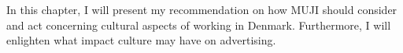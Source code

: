 In this chapter, I will present my recommendation on how MUJI should consider and act concerning cultural aspects of working in Denmark. Furthermore, I will enlighten what impact culture may have on advertising. 